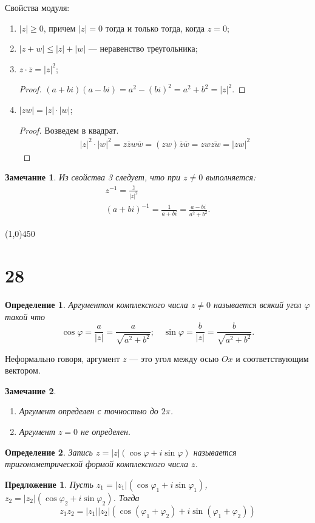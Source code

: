 \documentclass[a4paper,12pt]{article}
\newtheorem*{Def}{Определение}
\newtheorem{Suggestion}{Предложение}
\newtheorem*{Note}{Замечание}
\begin{document}
	Свойства модуля:
	\begin{enumerate}
		\item $|z| \geqslant 0$, причем $|z| = 0$ тогда и только тогда, когда $z = 0$;
		\item $|z + w| \leqslant |z| + |w|$ — неравенство треугольника;
		\item $z\cdot\overline{z} = |z|^2$;
		\begin{proof}
			$(a + bi)(a - bi) = a^2 - (bi)^2 = a^2 + b^2 = |z|^2$.
		\end{proof}
		\item $|zw| = |z| \cdot |w|$;
		\begin{proof}
			Возведем в квадрат.
			\begin{gather*}
			|z|^2 \cdot |w|^2 = z \overline{z} w \overline{w} = (zw)\overline{z}\overline{w} = zw\overline{zw} = |zw|^2
			\end{gather*}
		\end{proof}
	\end{enumerate}
	\begin{Note}
		Из свойства 3 следует, что при $z \neq 0$ выполняется: 
		\begin{gather*}
		z^{-1} = \frac{\overline{z}}{|z|^2}\\
		(a + bi)^{-1} = \frac{1}{a + bi} = \frac{a - bi}{a^2 + b^2}.
		\end{gather*}
	\end{Note}
	
	\begin{center}
		\line(1,0){450}
	\end{center}
	\section*{28}
	\begin{Def}
		Аргументом комплексного числа $z \neq 0$  называется всякий угол $\varphi$ такой что 
		\[
		\cos \varphi = \frac{a}{|z|} = \frac{a}{\sqrt{a^2 + b^2}}; \quad \sin \varphi = \frac{b}{|z|} = \frac{b}{\sqrt{a^2 + b^2}}.
		\]
	\end{Def}
	Неформально говоря, аргумент $z$ — это угол между осью $Ox$ и соответствующим вектором.
	
	\begin{Note} \ 
		\begin{enumerate}
			\item Аргумент определен с точностью до $2\pi$.
			\item Аргумент $z = 0$ не определен.
		\end{enumerate}
	\end{Note}
	\begin{Def}
		Запись $z = |z|(\cos\varphi + i\sin\varphi)$ называется тригонометрической формой комплексного числа $z$.
	\end{Def}
	\begin{Suggestion}
		Пусть $z_1 = |z_1|\left(\cos{\varphi_1}+i\sin{\varphi_1}\right)$, $z_2 = |z_2|\left(\cos{\varphi_2} + i\sin{\varphi_2}\right)$. Тогда 
		\[
		z_1z_2 = |z_1||z_2|\left(\cos\left(\varphi_1 + \varphi_2\right) + i\sin\left(\varphi_1 + \varphi_2\right)\right)
		\]
	\end{Suggestion}
	
\end{document}
